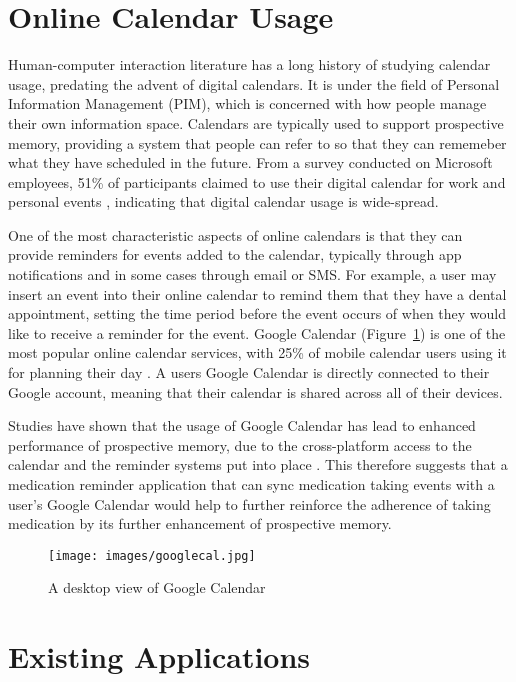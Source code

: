 \documentclass{l4proj}
\begin{document}
\section{Online Calendar Usage}

Human-computer interaction literature has a long history of studying calendar usage, predating the advent of digital calendars. It is under the field of Personal Information Management (PIM), which is concerned with how people manage their own information space. Calendars are typically used to support prospective memory, providing a system that people can refer to so that they can rememeber what they have scheduled in the future. From a survey conducted on Microsoft employees, 51\% of participants claimed to use their digital calendar for work and  personal events \citep{brush2005survey}, indicating that digital calendar usage is wide-spread. 

One of the most characteristic aspects of online calendars is that they can provide reminders for events added to the calendar, typically through app notifications and in some cases through email or SMS. For example, a user may insert an event into their online calendar to remind them that they have a dental appointment, setting the time period before the event occurs of when they would like to receive a reminder for the event. Google Calendar (Figure~\ref{fig:googlecal}) is one of the most popular online calendar services, with 25\% of mobile calendar users using it for planning their day \citep{ecal_2020}. A users Google Calendar is directly connected to their Google account, meaning that their calendar is shared across all of their devices.  

Studies have shown that the usage of Google Calendar has lead to enhanced performance of prospective memory, due to the cross-platform access to the calendar and the reminder systems put into place \citep{el2017google}. This therefore suggests that a medication reminder application that can sync medication taking events with a user's Google Calendar would help to further reinforce the adherence of taking medication by its further enhancement of prospective memory.    

\begin{figure}[!ht]
    \centering
    \texttt{[image: images/googlecal.jpg]}
    \caption{A desktop view of Google Calendar}
    \label{fig:googlecal}
\end{figure}

\section{Existing Applications}
\end{document}
